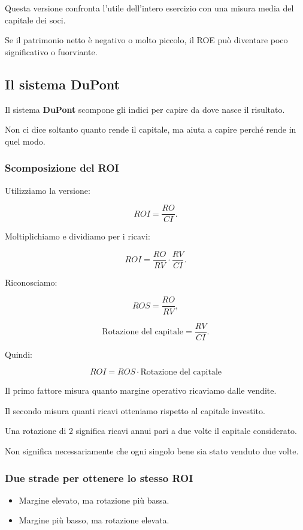 \noindent Questa versione confronta
l'utile dell'intero esercizio
con una misura media
del capitale dei soci.

\noindent Se il patrimonio netto
è negativo o molto piccolo,
il ROE può diventare
poco significativo o fuorviante.


\subsection{Il sistema DuPont}

\noindent Il sistema \textbf{DuPont}
scompone gli indici
per capire da dove nasce il risultato.

\noindent Non ci dice soltanto
quanto rende il capitale,
ma aiuta a capire
perché rende in quel modo.


\subsubsection*{Scomposizione del ROI}

\noindent Utilizziamo la versione:

\[
ROI=\frac{RO}{CI}.
\]

\noindent Moltiplichiamo
e dividiamo per i ricavi:

\[
ROI
=
\frac{RO}{RV}
\cdot
\frac{RV}{CI}.
\]

\noindent Riconosciamo:

\[
ROS=\frac{RO}{RV},
\]

\[
\text{Rotazione del capitale}
=
\frac{RV}{CI}.
\]

\noindent Quindi:

\[
\boxed{
ROI=ROS\cdot\text{Rotazione del capitale}
}
\]

\noindent Il primo fattore misura
quanto margine operativo
ricaviamo dalle vendite.

\noindent Il secondo misura
quanti ricavi otteniamo
rispetto al capitale investito.

\noindent Una rotazione di 2
significa ricavi annui
pari a due volte il capitale considerato.

\noindent Non significa necessariamente
che ogni singolo bene
sia stato venduto due volte.


\subsubsection*{Due strade per ottenere lo stesso ROI}

\begin{itemize}
    \item Margine elevato,
    ma rotazione più bassa.

    \item Margine più basso,
    ma rotazione elevata.
\end{itemize}

